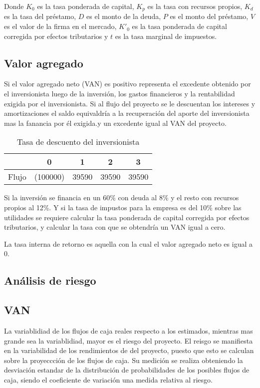 \documentclass[a4paper, 11pt, oneside]{article}
\begin{document}
Donde $K_0$ es la tasa ponderada de capital, $K_p$ es la tasa con recursos propios, $K_d$ es la tasa del préstamo, $D$ es el monto de la deuda, $P$ es el monto del préstamo, $V$ es el valor de la firma en el mercado, $K'_0$ es la tasa ponderada de capital corregida por efectos tributarios y $t$ es la tasa marginal de impuestos.

\subsection{Valor agregado}

Si el valor agregado neto (VAN) es positivo representa el excedente obtenido por el inversionista luego de la inversión, los gastos financieros y la rentabilidad exigida por el inversionista.
Si al flujo del proyecto se le descuentan los intereses y amortizaciones el saldo equivaldría a la recuperación del aporte del inversionista mas la fanancia por él exigida.y un excedente igual al VAN del proyecto.
\begin{table}
 \begin{tabular}{|c|c|c|c|c|}
  \hline
   & 0 & 1 & 2 & 3 \\
  \hline
  Flujo & (100000) & 39590 & 39590 & 39590 \\
  \hline
 \end{tabular}
  \caption{Tasa de descuento del inversionista}
\end{table}

Si la inversión se financia en un 60\% con deuda al 8\% y el resto con recursos propios al 12\%. Y si la tasa de impustos para la empresa es del 10\% sobre las utilidades se requiere calcular la tasa ponderada de capital corregida por efectos tributarios, y calcular la tasa con que se obtendría un VAN igual a cero.

La tasa interna de retorno es aquella con la cual el valor agregado neto es igual a 0.


\subsection{Análisis de riesgo}

\subsection{VAN}

La variablidiad de los flujos de caja reales respecto a los estimados, mientras mas grande sea la variablidiad, mayor es el riesgo del proyecto. El reisgo se manifiesta en la variabilidad de los rendimientos de del proyecto, puesto que esto se calculan sobre la proyeccción de los flujos de caja. Su medición se realiza obteniendo la desviación estandar de la distribución de probabilidades de los posibles flujos de caja, siendo el coeficiente de variación una medida relativa al riesgo.
\end{document}
